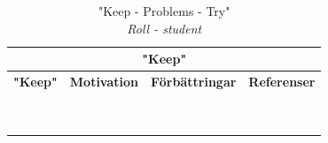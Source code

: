 \documentclass[conference]{IEEEtran}
\begin{document}
\begin{table}[htbp]
\caption{"Keep - Problems - Try"\\\textit{Roll - student}}
\begin{center}
\begin{tabular}{|c|c|c|c|}
\hline
\multicolumn{4}{|c|}{\cellcolor{grey}\textbf{"Keep"}}\\
\hline \rowcolor{grey}
\textbf{"Keep"}                         & \textbf{Motivation}      & \textbf{Förbättringar} & \textbf{Referenser} \\
\hline
                                        &                          &                     & \\
                                        &                          &                     & \\
\hline
                                        &                          &                     & \\
                                        &                          &                     & \\
\hline
                                        &                          &                     & \\
\hline
                                        &                          &                     & \\
\hline
                                        &                          &                     & \\
\hline
                                        &                          &                     & \\
\hline

\multicolumn{4}{c}{}\\


\end{tabular}
\end{center}
\end{table}
\end{document}
